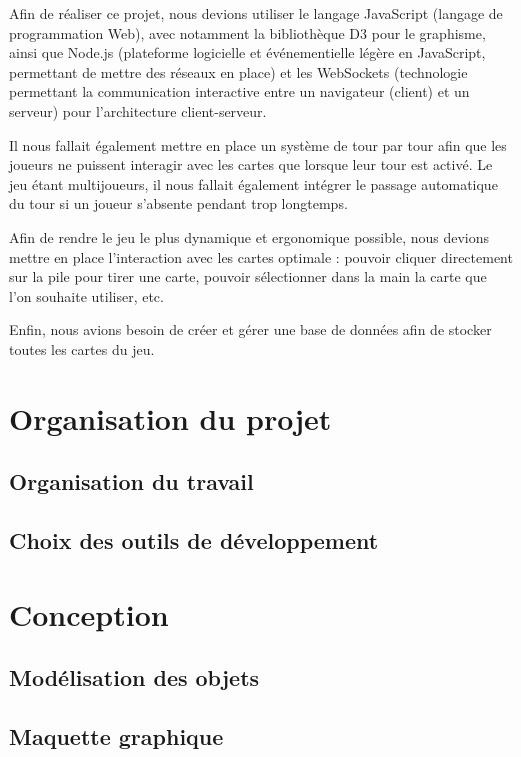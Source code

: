 \documentclass[12pt]{report}
\begin{document}
    Afin de réaliser ce projet, nous devions utiliser le langage JavaScript (langage de programmation Web), avec notamment la bibliothèque D3 pour le graphisme, ainsi que Node.js (plateforme logicielle et événementielle légère en JavaScript, permettant de mettre des réseaux en place) et les WebSockets (technologie permettant la communication interactive entre un navigateur (client) et un serveur) pour l'architecture client-serveur. 
    
    
    Il nous fallait également mettre en place un système de tour par tour afin que les joueurs ne puissent interagir avec les cartes que lorsque leur tour est activé. Le jeu étant multijoueurs, il nous fallait également intégrer le passage automatique du tour si un joueur s'absente pendant trop longtemps. 
    
    
    Afin de rendre le jeu le plus dynamique et ergonomique possible, nous devions mettre en place l'interaction avec les cartes optimale : pouvoir cliquer directement sur la pile pour tirer une carte, pouvoir sélectionner dans la main la carte que l'on souhaite utiliser, etc. 
    
    Enfin, nous avions besoin de créer et gérer une base de données afin de stocker toutes les cartes du jeu.
    
\chapter{Organisation du projet}

    \section{Organisation du travail}
    
    \section{Choix des outils de développement}
    
\chapter{Conception}
    
    \section{Modélisation des objets}
    
    \section{Maquette graphique}
    
\end{document}
